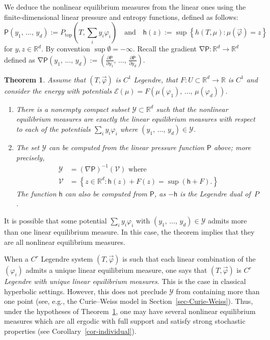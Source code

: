 \documentclass[AHL, Unicode, longabstracts,published]{cedram}
\theoremstyle{plain}
\newtheorem{theol}{Theorem}
\theoremstyle{plain}
\renewcommand\top{{\mathrm{top}}}
\newcommand{\grad}{\operatorname{\nabla}}
\newcommand{\hf}{\mathsf{h}}
\newcommand{\Pf}{\mathsf{P}}
\newcommand{\pot}{\varphi}
\newcounter{In}
\newcommand*\8{\infty}
\newcommand\RR{\mathbb{R}}
\newcommand{\En}{\mathcal{E}}
\newcommand{\scY}{\mathscr{Y}}
\newcommand{\scV}{\mathscr{V}}
\newcommand*{\romanenumi}{\renewcommand*{\theenumi}{\roman{enumi}}}
\begin{document}
We deduce the nonlinear equilibrium measures from the linear ones using the finite-dimensional linear pressure and entropy functions, defined as follows:
\[
\Pf(y_1,\,\dots,\,y_d) := P_\top\left(T,\sum_i y_i\pot_i \right)
\quad\text{and}\quad
\hf(z) :=\sup\left\{h(T,\mu):\mu(\vec\pot)=z\right\}
\]
for $y,z\in\RR^d$. By convention $\sup\emptyset=-\infty$. Recall the gradient $\grad\Pf:\RR^d\to\RR^d$ defined as $\grad\Pf(y_1,\,\dots,\,y_d):=(\frac{\partial\Pf}{\partial y_1},\,\dots,\,\frac{\partial\Pf}{\partial y_d})$.

\begin{theol}\label{thm-equilibria}
Assume that $(T,\vec\pot)$ is $C^{ 1}$ Legendre, that $F:U\subset\RR^d\to\RR$ is $C^{ 1}$ and consider the energy with potentials $\En(\mu) = F(\mu(\pot_1),\,\dots,\,\mu(\pot_d))$.
\begin{enumerate}\romanenumi
\item There is a nonempty compact subset $\scY\subset\RR^d$ such that the nonlinear equilibrium measures are exactly the \emph{linear} equilibrium measures with respect to each of the potentials $\sum_i y_i\pot_i$ where $(y_1,\,\dots,\,y_d)\in\scY$.

\item The set $\scY$ can be computed from the linear pressure function $\Pf$ above; more precisely,
\begin{align*}
\scY&=(\nabla \Pf)^{-1}(\scV) \text{ where }\\
\scV &=\left\{z\in\RR^d \colon \hf(z)+F(z)=\sup(\hf + F). \right\}
\end{align*}
The function $\hf$ can also be computed from $\Pf$, as $-\hf$ is the Legendre dual of~$P$.
\end{enumerate}
\end{theol}

It is possible that some potential $\sum_i y_i\pot_i$ with $(y_1,\,\dots,\,y_d)\in\scY$ admits more than one linear equilibrium measure. In this case, the theorem implies that they are all nonlinear equilibrium measures.


When a $C^r$ Legendre system $(T,\vec\pot)$ is such that each linear combination of the $(\pot_i)$ admits a unique linear equilibrium measure, one says that $(T,\vec\pot)$ is \emph{$C^r$ Legendre with unique linear equilibrium measures}. This is the case in classical hyperbolic settings. However, this does not preclude $\scY$ from containing more than one point (see, e.g., the Curie--Weiss model in Section~\ref{sec-Curie-Weiss}). Thus, under the hypotheses of Theorem~\ref{thm-equilibria}, one may have several nonlinear equilibrium measures which are all ergodic with full support and satisfy strong stochastic properties (see Corollary~\ref{cor-individual}).
\end{document}

